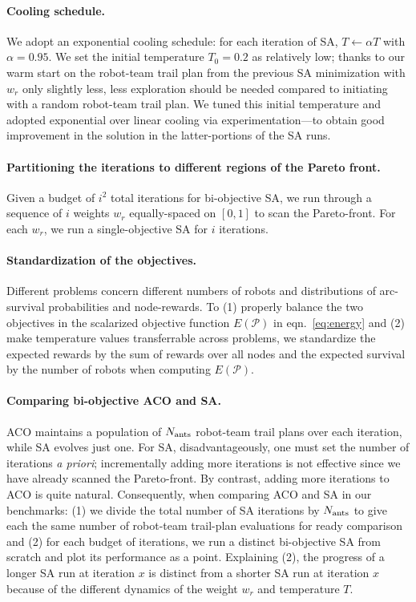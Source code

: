 \documentclass[fleqn,10pt,lineno]{wlpeerj}
\begin{document}
\paragraph{Cooling schedule.}
We adopt an exponential cooling schedule: for each iteration of SA, $T \leftarrow \alpha T$ with $\alpha=0.95$. We set the initial temperature $T_0=0.2$ as relatively low; thanks to our warm start on the robot-team trail plan from the previous SA minimization with $w_r$ only slightly less, less exploration should be needed compared to initiating with a random robot-team trail plan.
We tuned this initial temperature and adopted exponential over linear cooling via experimentation---to obtain good improvement in the solution in the latter-portions of the SA runs.

\paragraph{Partitioning the iterations to different regions of the Pareto front.}
Given a budget of $i^2$ total iterations for bi-objective SA, we run through a sequence of $i$ weights $w_r$ equally-spaced on $[0, 1]$ to scan the Pareto-front. For each $w_r$, we run a single-objective SA for $i$ iterations. 

\paragraph{Standardization of the objectives.}
Different problems concern different numbers of robots and distributions of arc-survival probabilities and node-rewards.
To (1) properly balance the two objectives in the scalarized objective function $E(\mathcal{P})$ in eqn.~\ref{eq:energy} and (2) make temperature values transferrable across problems, we standardize the expected rewards by the sum of rewards over all nodes and the expected survival by the number of robots when computing $E(\mathcal{P})$.

\paragraph{Comparing bi-objective ACO and SA.}
ACO maintains a population of $N_{\rm ants}$ robot-team trail plans over each iteration, while SA evolves just one.
For SA, disadvantageously, one must set the number of iterations \emph{a priori}; incrementally adding more iterations is not effective since we have already scanned the Pareto-front. By contrast, adding more iterations to ACO is quite natural.
Consequently, when comparing ACO and SA in our benchmarks: 
(1) we divide the total number of SA iterations by $N_{\rm ants}$ to give each the same number of robot-team trail-plan evaluations for ready comparison and 
(2) for each budget of iterations, we run a distinct bi-objective SA from scratch and plot its performance as a point. Explaining (2), the progress of a longer SA run at iteration $x$ is distinct from a shorter SA run at iteration $x$ because of the different dynamics of the weight $w_r$ and temperature $T$.
\end{document}
